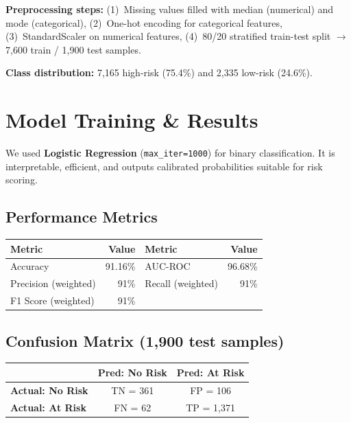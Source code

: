 \documentclass[12pt, a4paper]{article}
\begin{document}
\textbf{Preprocessing steps:} (1)~Missing values filled with median (numerical) and mode (categorical), (2)~One-hot encoding for categorical features, (3)~StandardScaler on numerical features, (4)~80/20 stratified train-test split $\rightarrow$ 7,600 train / 1,900 test samples.

\textbf{Class distribution:} 7,165 high-risk (75.4\%) and 2,335 low-risk (24.6\%).

\section{Model Training \& Results}
We used \textbf{Logistic Regression} (\texttt{max\_iter=1000}) for binary classification. It is interpretable, efficient, and outputs calibrated probabilities suitable for risk scoring.

\subsection{Performance Metrics}
\begin{table}[H]
\centering\small
\begin{tabular}{lr|lr}
\toprule
\textbf{Metric} & \textbf{Value} & \textbf{Metric} & \textbf{Value} \\
\midrule
Accuracy  & 91.16\% & AUC-ROC & 96.68\% \\
Precision (weighted) & 91\% & Recall (weighted) & 91\% \\
F1 Score (weighted)  & 91\% & & \\
\bottomrule
\end{tabular}
\end{table}

\subsection{Confusion Matrix (1,900 test samples)}
\begin{table}[H]
\centering\small
\begin{tabular}{l|cc}
 & \textbf{Pred: No Risk} & \textbf{Pred: At Risk} \\
\midrule
\textbf{Actual: No Risk} & TN = 361 & FP = 106 \\
\textbf{Actual: At Risk} & FN = 62  & TP = 1,371 \\
\end{tabular}
\end{table}
\end{document}
